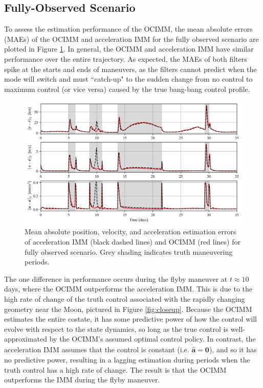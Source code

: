\documentclass[letterpaper, preprint, paper,11pt]{AAS}	%
\begin{document}
\subsection{Fully-Observed Scenario}

To assess the estimation performance of the OCIMM, the mean absolute errors (MAEs) of  the OCIMM and acceleration IMM for the fully observed scenario are plotted in Figure \ref{fig:MAE-normal}. In general, the OCIMM and acceleration IMM have similar performance over the entire trajectory. As expected, the MAEs of both filters spike at the starts and ends of maneuvers, as the filters cannot predict when the mode will switch and must ``catch-up" to the sudden change from no control to maximum control (or vice versa) caused by the true bang-bang control profile.

\begin{figure}
    \centering
    \includegraphics[width=1\linewidth]{Figures/MAE_normal.png}
    \caption{Mean absolute position, velocity, and acceleration estimation errors of acceleration IMM (black dashed lines) and OCIMM (red lines) for fully observed scenario. Grey shading indicates truth maneuvering periods.}
    \label{fig:MAE-normal}
\end{figure}

The one difference in performance occurs during the flyby maneuver at $t\approx 10$ days, where the OCIMM outperforms the acceleration IMM. This is due to the high rate of change of the truth control associated with the rapidly changing geometry near the Moon, pictured in Figure \ref{fig:closeup}. Because the OCIMM estimates the entire costate, it has some predictive power of how the control will evolve with respect to the state dynamics, so long as the true control is well-approximated by the OCIMM's assumed optimal control policy. In contrast, the acceleration IMM assumes that the control is constant (i.e. $\dot{\hat{\bm{a}}} = \bm{0}$), and so it has no predictive power, resulting in a lagging estimation during periods when the truth control has a high rate of change. The result is that the OCIMM outperforms the IMM during the flyby maneuver. 
\end{document}
